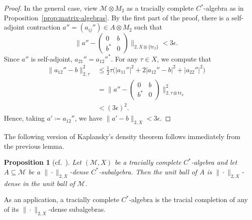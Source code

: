 \documentclass[a4paper,11pt]{amsart}
\newtheorem{proposition}[theorem]{Proposition}
\theoremstyle{definition}
\numberwithin{equation}{section}
\numberwithin{theorem}{section}
\newcommand{\M}{\mathcal{M}}
\begin{document}
\begin{proof}
	In the general case, view $\mathcal M \otimes M_2$ as a tracially complete $C^*$-algebra as in Proposition~\ref{prop:matrix-algebras}.  By the first part of the proof, there is a self-adjoint contraction $a'' = (a_{ij}'') \in A \otimes M_2$ such that
	\begin{equation}
		\Big\| a'' - \begin{pmatrix} 0 & b \\ b^* & 0 \end{pmatrix} \Big\|_{2, X \otimes \{\mathrm{tr}_2\}} < 3 \epsilon.
	\end{equation}
	Since $a''$ is self-adjoint, $a_{21}'' = a_{12}''^*$.
	For any $\tau \in X$, we compute that 
	\begin{equation}\begin{split} 
		\|a_{12}''-b\|_{2, \tau}^2 &\leq \frac{1}{2}\tau\big(|a_{11}''|^2 + 2|a_{12}''-b|^2 + |a_{22}''|^2\big) \\
		&= \Big\| a'' - \begin{pmatrix} 0 & b \\ b^* & 0 \end{pmatrix} \Big\|_{2, \tau \otimes \mathrm{tr}_2}^2 \\
		&< (3\epsilon)^2.
	\end{split}\end{equation}
	Hence, taking $a' \coloneqq a_{12}''$, we have $\|a' - b\|_{2, X} < 3 \epsilon$.
\end{proof}

The following version of Kaplansky's density theorem follows immediately from the previous lemma.

\begin{proposition}[{cf.~\cite[Theorem 4.3.3]{Mu90}}]
	\label{prop:UnitBallDensity}
	Let $(\M,X)$ be a tracially complete $C^*$-algebra and let $A \subseteq \M$ be a $\|\cdot\|_{2,X}$-dense $C^*$-subalgebra.
	Then the unit ball of $A$ is $\|\cdot\|_{2,X}$-dense in the unit ball of $\M$.
\end{proposition}

As an application, a tracially complete $C^*$-algebra is the tracial completion of any of its $\|\cdot\|_{2,X}$-dense subalgebras. 
\end{document}
